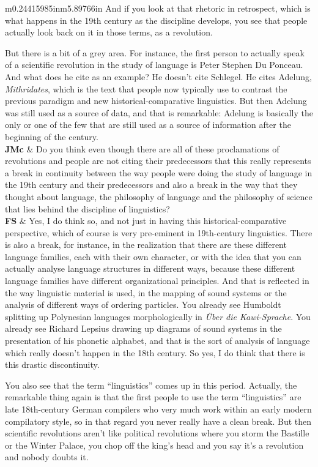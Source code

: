 \documentclass[12pt]{article}
\begin{document}
\begin{flushleft}
\begin{supertabular}{m{0.24415985in}m{5.89766in}}
And if you look at that rhetoric in retrospect, which is what happens in the 19th century as the discipline develops, you see that people actually look back on it in those terms, as a revolution. 

But there is a bit of a grey area. For instance, the first person to actually speak of a scientific revolution in the study of language is Peter Stephen Du Ponceau. And what does he cite as an example? He doesn’t cite Schlegel. He cites Adelung, \textit{Mithridates}, which is the text that people now typically use to contrast the previous paradigm and new historical-comparative linguistics. But then Adelung was still used as a source of data, and that is remarkable: Adelung is basically the only or one of the few that are still used as a source of information after the beginning of the century.\\
\textbf{JMc}\newline
 &
Do you think even though there are all of these proclamations of revolutions and people are not citing their predecessors that this really represents a break in continuity between the way people were doing the study of language in the 19th century and their predecessors and also a break in the way that they thought about language, the philosophy of language and the philosophy of science that lies behind the discipline of linguistics?\\
\textbf{FS}\newline
 &
Yes, I do think so, and not just in having this historical-comparative perspective, which of course is very pre-eminent in 19th-century linguistics. There is also a break, for instance, in the realization that there are these different language families, each with their own character, or with the idea that you can actually analyse language structures in different ways, because these different language families have different organizational principles. And that is reflected in the way linguistic material is used, in the mapping of sound systems or the analysis of different ways of ordering particles. You already see Humboldt splitting up Polynesian languages morphologically in \textit{Über die Kawi-Sprache}. You already see Richard Lepsius drawing up diagrams of sound systems in the presentation of his phonetic alphabet, and that is the sort of analysis of language which really doesn’t happen in the 18th century. So yes, I do think that there is this drastic discontinuity. 

You also see that the term “linguistics” comes up in this period. Actually, the remarkable thing again is that the first people to use the term “linguistics” are late 18th-century German compilers who very much work within an early modern compilatory style, so in that regard you never really have a clean break. But then scientific revolutions aren’t like political revolutions where you storm the Bastille or the Winter Palace, you chop off the king’s head and you say it’s a revolution and nobody doubts it. 


\end{supertabular}
\end{flushleft}
\end{document}
